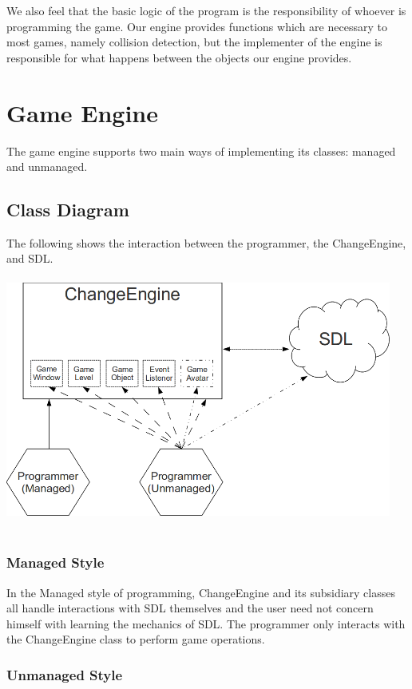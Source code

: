 \documentclass[12pt]{article}
\begin{document}
    We also feel that the basic logic of the program is the responsibility of whoever is programming the game. Our engine provides functions which are necessary to most games, namely collision detection, but the implementer of the engine is responsible for what happens between the objects our engine provides.

  \section{Game Engine}
    The game engine supports two main ways of implementing its classes: managed and unmanaged.

\pagebreak
\subsection{Class Diagram}

The following shows the interaction between the programmer, the ChangeEngine, and SDL.
\\
\\
\includegraphics[width=5in]{class-overview.png}
\\
\\

\subsubsection{Managed Style}

In the Managed style of programming, ChangeEngine and its subsidiary classes all handle interactions with SDL themselves and the user need not concern himself with learning the mechanics of SDL. The programmer only interacts with the ChangeEngine class to perform game operations.

\subsubsection{Unmanaged Style}
\end{document}
